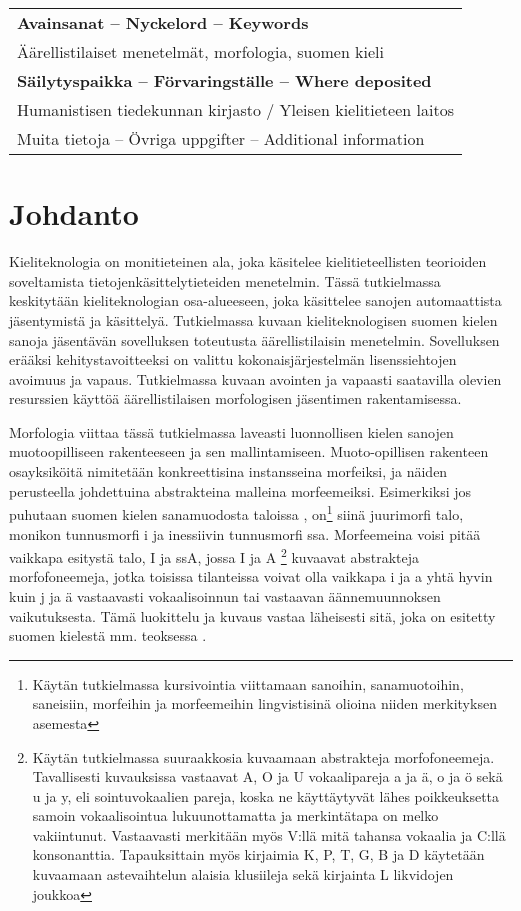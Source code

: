 \documentclass[free]{flammie}
\begin{document}
\begin{tabular}{|l|}
    \hline
    \bf Avainsanat – Nyckelord – Keywords \\
    Äärellistilaiset menetelmät, morfologia, suomen kieli \\
    \hline
    \bf Säilytyspaikka – Förvaringställe – Where deposited \\
    Humanistisen tiedekunnan kirjasto / Yleisen kielitieteen laitos \\
    \hline
    Muita tietoja – Övriga uppgifter – Additional information \\
    \hline
\end{tabular}
\newpage

\section{Johdanto}

Kieliteknologia on monitieteinen ala, joka käsitelee kielitieteellisten
teorioiden soveltamista tietojenkäsittelytieteiden menetelmin. Tässä
tutkielmassa keskitytään kieliteknologian osa-alueeseen, joka käsittelee sanojen
automaattista jäsentymistä ja käsittelyä. Tutkielmassa kuvaan kieliteknologisen
suomen kielen sanoja jäsentävän sovelluksen toteutusta äärellistilaisin
menetelmin. Sovelluksen erääksi kehitystavoitteeksi on valittu
kokonaisjärjestelmän lisenssiehtojen avoimuus ja vapaus. Tutkielmassa kuvaan
avointen ja vapaasti saatavilla olevien resurssien käyttöä äärellistilaisen
morfologisen jäsentimen rakentamisessa.

Morfologia viittaa tässä tutkielmassa laveasti luonnollisen kielen sanojen
muotoopilliseen rakenteeseen ja sen mallintamiseen. Muoto-opillisen rakenteen
osayksiköitä nimitetään konkreettisina instansseina morfeiksi, ja näiden
perusteella johdettuina abstrakteina malleina morfeemeiksi. Esimerkiksi jos
puhutaan suomen kielen sanamuodosta taloissa , on\footnote{Käytän tutkielmassa
kursivointia viittamaan sanoihin, sanamuotoihin, saneisiin, morfeihin ja
morfeemeihin lingvistisinä olioina niiden merkityksen asemesta} siinä juurimorfi
talo, monikon tunnusmorfi i ja inessiivin tunnusmorfi ssa.  Morfeemeina voisi
pitää vaikkapa esitystä talo, I ja ssA, jossa I ja A \footnote{Käytän
tutkielmassa suuraakkosia kuvaamaan abstrakteja morfofoneemeja.  Tavallisesti
kuvauksissa vastaavat A, O ja U vokaalipareja a ja ä, o ja ö sekä u ja y, eli
sointuvokaalien pareja, koska ne käyttäytyvät lähes poikkeuksetta samoin
vokaalisointua lukuunottamatta ja merkintätapa on melko vakiintunut.
Vastaavasti merkitään myös V:llä mitä tahansa vokaalia ja C:llä konsonanttia.
Tapauksittain myös kirjaimia K, P, T, G, B ja D käytetään kuvaamaan
astevaihtelun alaisia klusiileja sekä kirjainta L likvidojen joukkoa} kuvaavat
abstrakteja morfofoneemeja, jotka toisissa tilanteissa voivat olla vaikkapa i ja
a yhtä hyvin kuin j ja ä vastaavasti vokaalisoinnun tai vastaavan
äännemuunnoksen vaikutuksesta. Tämä luokittelu ja kuvaus vastaa läheisesti sitä,
joka on esitetty suomen kielestä mm. teoksessa \cite{karlsson1998suomen}.
\end{document}
